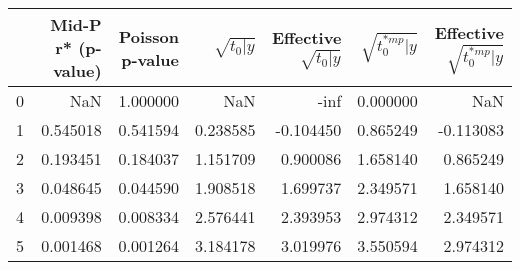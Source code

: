 \begin{tabular}{lrrrrrr}
\toprule
 & Mid-P r* (p-value) & Poisson p-value & $\sqrt{t_0\vert y}$ & Effective $\sqrt{t_0\vert y}$ & $\sqrt{t_0^{*mp}\vert y}$ & Effective $\sqrt{t_0^{*mp}\vert y}$ \\
\midrule
0 & NaN & 1.000000 & NaN & -inf & 0.000000 & NaN \\
1 & 0.545018 & 0.541594 & 0.238585 & -0.104450 & 0.865249 & -0.113083 \\
2 & 0.193451 & 0.184037 & 1.151709 & 0.900086 & 1.658140 & 0.865249 \\
3 & 0.048645 & 0.044590 & 1.908518 & 1.699737 & 2.349571 & 1.658140 \\
4 & 0.009398 & 0.008334 & 2.576441 & 2.393953 & 2.974312 & 2.349571 \\
5 & 0.001468 & 0.001264 & 3.184178 & 3.019976 & 3.550594 & 2.974312 \\
\bottomrule
\end{tabular}
